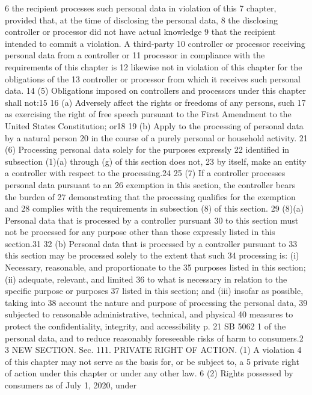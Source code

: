 6 the recipient processes such personal data in violation of this
7 chapter, provided that, at the time of disclosing the personal data,
8 the disclosing controller or processor did not have actual knowledge
9 that the recipient intended to commit a violation. A third-party
10 controller or processor receiving personal data from a controller or
11 processor in compliance with the requirements of this chapter is
12 likewise not in violation of this chapter for the obligations of the
13 controller or processor from which it receives such personal data.
14 (5) Obligations imposed on controllers and processors under this
chapter shall not:15
16 (a) Adversely affect the rights or freedoms of any persons, such
17 as exercising the right of free speech pursuant to the First
Amendment to the United States Constitution; or18
19 (b) Apply to the processing of personal data by a natural person
20 in the course of a purely personal or household activity.
21 (6) Processing personal data solely for the purposes expressly
22 identified in subsection (1)(a) through (g) of this section does not,
23 by itself, make an entity a controller with respect to the
processing.24
25 (7) If a controller processes personal data pursuant to an
26 exemption in this section, the controller bears the burden of
27 demonstrating that the processing qualifies for the exemption and
28 complies with the requirements in subsection (8) of this section.
29 (8)(a) Personal data that is processed by a controller pursuant
30 to this section must not be processed for any purpose other than
those expressly listed in this section.31
32 (b) Personal data that is processed by a controller pursuant to
33 this section may be processed solely to the extent that such
34 processing is: (i) Necessary, reasonable, and proportionate to the
35 purposes listed in this section; (ii) adequate, relevant, and limited
36 to what is necessary in relation to the specific purpose or purposes
37 listed in this section; and (iii) insofar as possible, taking into
38 account the nature and purpose of processing the personal data,
39 subjected to reasonable administrative, technical, and physical
40 measures to protect the confidentiality, integrity, and accessibility
p. 21 SB 5062
1 of the personal data, and to reduce reasonably foreseeable risks of
harm to consumers.2
3 NEW SECTION. Sec. 111. PRIVATE RIGHT OF ACTION. (1) A violation
4 of this chapter may not serve as the basis for, or be subject to, a
5 private right of action under this chapter or under any other law.
6 (2) Rights possessed by consumers as of July 1, 2020, under

